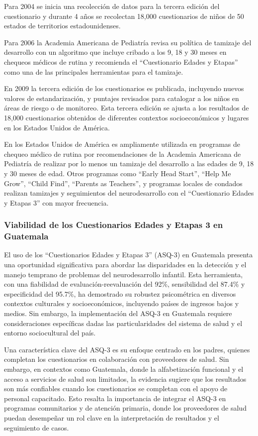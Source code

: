 Para 2004 se inicia una recolección de datos para la tercera edición del
cuestionario y durante 4 años se recolectan 18,000 cuestionarios de niños de 50
estados de territorios estadounidenses. \cite{ASQ4decades}

Para 2006 la Academia Americana de Pediatría revisa su política de tamizaje del
desarrollo con un algoritmo que incluye cribado a los 9, 18 y 30 meses en
chequeos médicos de rutina y recomienda el ``Cuestionario Edades y Etapas''
como una de las principales herramientas para el tamizaje.
\cite{Pediatrics2006}
 
En 2009 la tercera edición de los cuestionarios es publicada, incluyendo nuevos
valores de estandarización, y puntajes revisados para catalogar a los niños en
áreas de riesgo o de monitoreo. Esta tercera edición se ajusta a los resultados
de 18,000 cuestionarios obtenidos de diferentes contextos socioeconómicos y
lugares en los Estados Unidos de América. \cite{ASQ4decades}

En los Estados Unidos de América es ampliamente utilizada en programas de
chequeo médico de rutina por recomendaciones de la Academia Americana de
Pediatría de realizar por lo menos un tamizaje del desarrollo a las edades de
9, 18 y 30 meses de edad. Otros programas como ``Early Head Start'', ``Help Me
Grow'', ``Child Find'', ``Parents as Teachers'', y programas locales de
condados realizan tamizajes y seguimientos del neurodesarrollo con el
``Cuestionario Edades y Etapas 3'' con mayor frecuencia. \cite{ASQWorld}

\subsubsection{Viabilidad de los Cuestionarios Edades y Etapas 3 en Guatemala}
El uso de los ``Cuestionarios Edades y Etapas 3'' (ASQ-3) en Guatemala presenta
una oportunidad significativa para abordar las disparidades en la detección y
el manejo temprano de problemas del neurodesarrollo infantil. Esta herramienta,
con una fiabilidad de evaluación-reevaluación del 92\%, sensibilidad del 87.4\%
y especificidad del 95.7\%, ha demostrado su robustez psicométrica en diversos
contextos culturales y socioeconómicos, incluyendo países de ingresos bajos y
medios. Sin embargo, la implementación del ASQ-3 en Guatemala requiere
consideraciones específicas dadas las particularidades del sistema de salud y
el entorno sociocultural del país. \cite{Vameghi2013-uo, Manasyan2023}

Una característica clave del ASQ-3 es su enfoque centrado en los padres,
quienes completan los cuestionarios en colaboración con proveedores de salud.
Sin embargo, en contextos como Guatemala, donde la alfabetización funcional y
el acceso a servicios de salud son limitados, la evidencia sugiere que los
resultados son más confiables cuando los cuestionarios se completan con el
apoyo de personal capacitado. Esto resalta la importancia de integrar el ASQ-3
en programas comunitarios y de atención primaria, donde los proveedores de
salud puedan desempeñar un rol clave en la interpretación de resultados y el
seguimiento de casos. \cite{Manasyan2023, Colbert2021}
